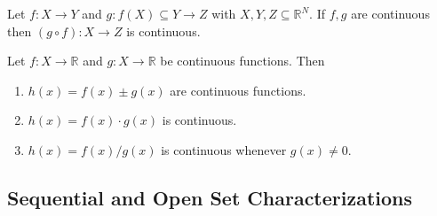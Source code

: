 \documentclass{article}
\begin{document}
\begin{theorem}
  Let $f: X \to Y$ and $g: f(X) \subseteq Y \to Z$ with $X, Y, Z \subseteq \mathbb{R}^N$. If $f, g$ are continuous then $(g \circ f): X \to Z$ is continuous.
\end{theorem}

\begin{theorem}
  Let $f: X \to \mathbb{R}$ and $g: X \to \mathbb{R}$ be continuous functions. Then
  \begin{enumerate}
    \item $h(x) = f(x) \pm g(x)$ are continuous functions.
    \item $h(x) = f(x) \cdot g(x)$ is continuous.
    \item $h(x) = f(x) / g(x)$ is continuous whenever $g(x) \ne 0$.
  \end{enumerate}
\end{theorem}

\subsection{Sequential and Open Set Characterizations}
\label{sub:sequential_and_open_set_characterizations}
\end{document}
